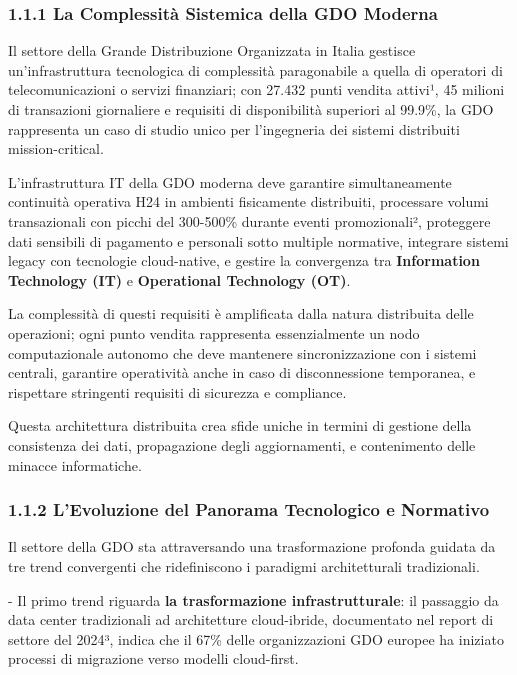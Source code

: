 \documentclass{report}
\begin{document}
\subsubsection{\texorpdfstring{\textbf{1.1.1 La Complessità Sistemica
della GDO
Moderna}}{1.1.1 La Complessità Sistemica della GDO Moderna}}\label{la-complessituxe0-sistemica-della-gdo-moderna}

Il settore della Grande Distribuzione Organizzata in Italia gestisce
un'infrastruttura tecnologica di complessità paragonabile a quella di
operatori di telecomunicazioni o servizi finanziari; con 27.432 punti
vendita attivi¹, 45 milioni di transazioni giornaliere e requisiti di
disponibilità superiori al 99.9\%, la GDO rappresenta un caso di studio
unico per l'ingegneria dei sistemi distribuiti mission-critical.

L'infrastruttura IT della GDO moderna deve garantire simultaneamente
continuità operativa H24 in ambienti fisicamente distribuiti, processare
volumi transazionali con picchi del 300-500\% durante eventi
promozionali², proteggere dati sensibili di pagamento e personali sotto
multiple normative, integrare sistemi legacy con tecnologie
cloud-native, e gestire la convergenza tra \textbf{Information Technology (IT)} e
\textbf{Operational Technology (OT)}.

La complessità di questi requisiti è amplificata dalla natura
distribuita delle operazioni; ogni punto vendita rappresenta
essenzialmente un nodo computazionale autonomo che deve mantenere
sincronizzazione con i sistemi centrali, garantire operatività anche in
caso di disconnessione temporanea, e rispettare stringenti requisiti di
sicurezza e compliance.

Questa architettura distribuita crea sfide uniche in termini di gestione
della consistenza dei dati, propagazione degli aggiornamenti, e
contenimento delle minacce informatiche.

\subsubsection{\texorpdfstring{\textbf{1.1.2 L'Evoluzione del Panorama
Tecnologico e
Normativo}}{1.1.2 L'Evoluzione del Panorama Tecnologico e Normativo}}\label{levoluzione-del-panorama-tecnologico-e-normativo}

Il settore della GDO sta attraversando una trasformazione profonda
guidata da tre trend convergenti che ridefiniscono i paradigmi
architetturali tradizionali.

- Il primo trend riguarda \textbf{la trasformazione infrastrutturale}:
il passaggio da data center tradizionali ad architetture cloud-ibride,
documentato nel report di settore del 2024³, indica che il 67\% delle
organizzazioni GDO europee ha iniziato processi di migrazione verso
modelli cloud-first.
\end{document}
